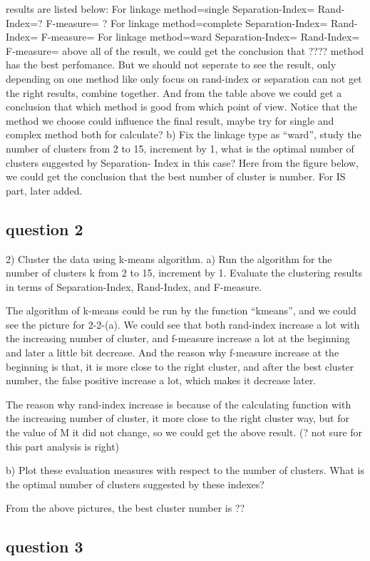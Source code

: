 \documentclass[]{article}
\begin{document}
results are listed below:
For linkage method=single
Separation-Index=
Rand-Index=?
F-measure= ?
For linkage method=complete
Separation-Index=
Rand-Index=
F-measure=
For linkage method=ward
Separation-Index=
Rand-Index=
F-measure= 
above all of the result, we could get the conclusion that ???? method has the best perfomance. But we should not seperate to see the result, only depending on one method like only focus on rand-index or separation can not get the right results, combine together.
And from the table above we could get a conclusion that which method is good from which point of view.
Notice that the method we choose could influence the final result, maybe try for single and complex method both for calculate?
b) Fix the linkage type as “ward”, study the number of clusters from 2 to 15, increment by 1, what is the optimal number of clusters suggested by Separation- Index in this case?
Here from the figure below, we could get the conclusion that the best number of cluster is number.
For IS part, later added.
\subsection{question 2}
2) Cluster the data using k-means algorithm.
a) Run the algorithm for the number of clusters k from 2 to 15, increment by 1. Evaluate the clustering results in terms of Separation-Index, Rand-Index, and F-measure.


The algorithm of k-means could be run by the function “kmeans”, and we could see the picture for 2-2-(a). We could see that both rand-index increase a lot with the increasing number of cluster, and f-measure increase a lot at the beginning and later a little bit decrease.
And the reason why f-measure increase at the beginning is that, it is more close to the right cluster, and after the best cluster number, the false positive increase a lot, which makes it decrease later.

The reason why rand-index increase is because of the calculating function with the increasing number of cluster, it more close to the right cluster way, but for the value of M it did not change, so we could get the above result. (? not sure for this part analysis is right)

b) Plot these evaluation measures with respect to the number of clusters. What is the optimal number of clusters suggested by these indexes?

From the above pictures, the best cluster number is ??

\subsection{question 3}
\end{document}
